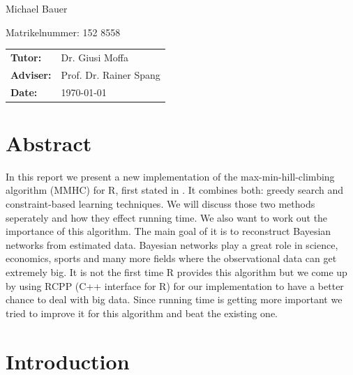 \begin{center}
\begin{large}
Michael Bauer
\end{large}

\begin{small}
Matrikelnummer: 152 8558
\end{small}

\vspace{1cm}
\begin{tabular}{ll}
{\bf Tutor:} &Dr. Giusi Moffa\\
{\bf Adviser:} &Prof. Dr. Rainer Spang\\
{\bf Date:} &\today\\
\end{tabular}

\end{center}
\clearpage


\pagestyle{useheadings} %

\tableofcontents
\listoffigures
\listoftables

\chapter{Abstract}

In this report we present a new implementation of the max-min-hill-climbing algorithm (MMHC) for R, first stated in \cite{TBA}. It combines both: greedy search and constraint-based learning techniques. We will discuss those two methods seperately and how they effect running time. We also want to work out the importance of this algorithm. The main goal of it is to reconstruct Bayesian networks from estimated data. Bayesian networks play a great role in science, economics, sports and many more fields where the observational data can get extremely big. It is not the first time R provides this algorithm but we come up by using RCPP (C++ interface for R) for our implementation to have a better chance to deal with big data. Since running time is getting more important we tried to improve it for this algorithm and beat the existing one.

\chapter{Introduction}

